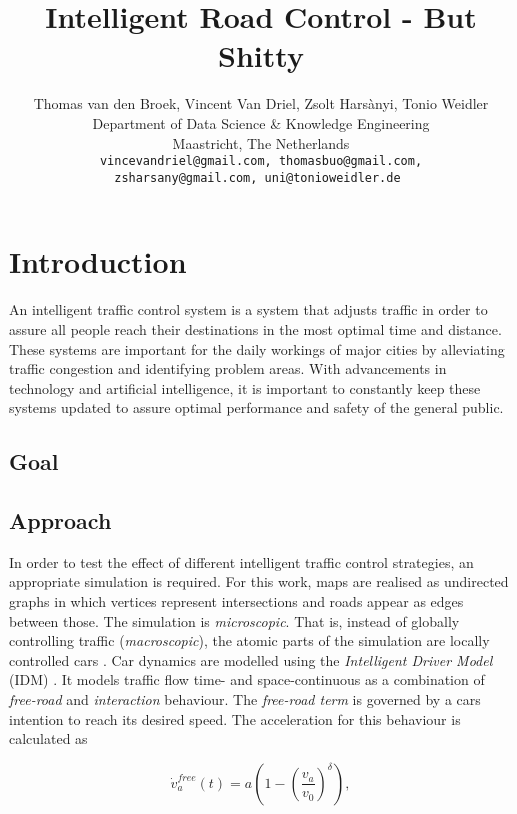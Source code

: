 \documentclass[10pt]{article}
\title{Intelligent Road Control - But Shitty}
\author{Thomas van den Broek, Vincent Van Driel, Zsolt Harsànyi, Tonio Weidler\\
	Department of Data Science \& Knowledge Engineering\\
	Maastricht, The Netherlands\\
	\tt \small vincevandriel@gmail.com, thomasbuo@gmail.com,\\
	\tt \small zsharsany@gmail.com, uni@tonioweidler.de
}
\begin{document}
\maketitle

\begin{abstract}
	
\end{abstract}

\section{Introduction}
An intelligent traffic control system is a system that adjusts traffic in order to assure all people reach their destinations in the most optimal time and distance.  These systems are important for the daily workings of major cities by alleviating traffic congestion and identifying problem areas.  With advancements in technology and artificial intelligence, it is important to constantly keep these systems updated to assure optimal performance and safety of the general public.

\subsection{Goal}

\subsection{Approach}
In order to test the effect of different intelligent traffic control strategies, an appropriate simulation is required. For this work, maps are realised as undirected graphs in which vertices represent intersections and roads appear as edges between those. The simulation is \textit{microscopic}. That is, instead of globally controlling traffic (\textit{macroscopic}), the atomic parts of the simulation are locally controlled cars \citep[see also][]{krajzewicz2002sumo}. Car dynamics are modelled using the \textit{Intelligent Driver Model} (IDM) \citep{treiber2000congested}. It models traffic flow time- and space-continuous as a combination of \textit{free-road} and \textit{interaction} behaviour. The \textit{free-road term} is governed by a cars intention to reach its desired speed. The acceleration for this behaviour is calculated \citep{treiber2000congested} as

\begin{equation}
	\label{eq:free-road-term}
	\dot{v}_a^{free}(t) = a ( 1 - ( \frac{v_a}{v_0} )^\delta),
\end{equation}
\end{document}
